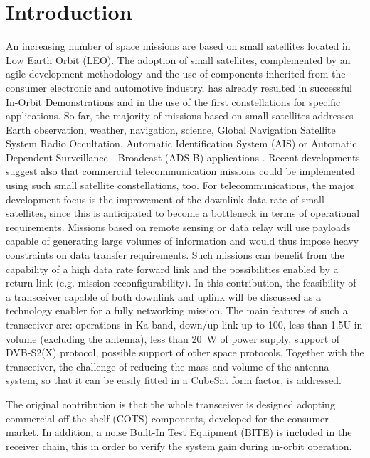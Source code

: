 \documentclass[conference,10pt,a4paper]{IEEEtran}%
\begin{document}
\section{Introduction}
An increasing number of space missions are based on small satellites located in Low Earth Orbit (LEO).
The adoption of small satellites, complemented by an agile development methodology and the use of components inherited from the consumer electronic and automotive industry, has already resulted in successful In-Orbit Demonstrations and in the use of the first constellations for specific applications.
So far, the majority of missions based on small satellites addresses Earth observation, weather, navigation, science, Global Navigation Satellite System Radio Occultation, Automatic Identification System (AIS) or Automatic Dependent Surveillance - Broadcast (ADS-B) applications \cite{Gregorio2016}.
Recent developments suggest also that commercial telecommunication missions could be implemented using such small satellite constellations, too.
For telecommunications, the major development focus is the improvement of the downlink data rate of small satellites, since this is anticipated to become a bottleneck in terms of operational requirements.
Missions based on remote sensing or data relay will use payloads capable of generating large volumes of information and would thus impose heavy constraints on data transfer requirements.
Such missions can benefit from the capability of a high data rate forward link and the possibilities enabled by a return link (e.g. mission reconfigurability).
In this contribution, the feasibility of a transceiver capable of both downlink and uplink will be discussed as a technology enabler for a fully networking mission.
The main features of such a  transceiver are: operations in Ka-band, down/up-link up to \SI{100}{\Mbps}, less than 1.5U in volume (excluding the antenna), less than \SI{20}{\W} of power supply, support of DVB-S2(X) protocol, possible support of other space protocols.
Together with the transceiver, the challenge of reducing the mass and volume of the antenna system, so that it can be easily fitted in a CubeSat form factor, is addressed.

The original contribution is that the whole transceiver is designed adopting commercial-off-the-shelf (COTS) components, developed for the consumer market.
In addition, a noise Built-In Test Equipment (BITE) is included in the receiver chain, this in order to verify the system gain during in-orbit operation.
\end{document}
